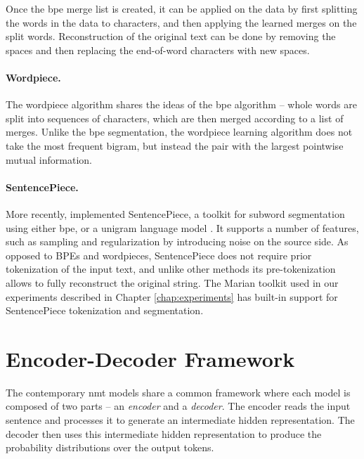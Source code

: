 Once the \ac{bpe} merge list is created, it can be applied on the data by first
splitting the words in the data to characters, and then applying the learned
merges on the split words. Reconstruction of the original text can be done by
removing the spaces and then replacing the end-of-word characters with new
spaces.

\paragraph{Wordpiece.} The wordpiece algorithm
\citep{schuster-nakajima-2012-japanese,wu2016google} shares the ideas of the
\ac{bpe} algorithm -- whole words are split into sequences of characters, which
are then merged according to a list of merges. Unlike the \ac{bpe}
segmentation, the wordpiece learning algorithm does not take the most frequent
bigram, but instead the pair with the largest pointwise mutual
information.

\paragraph{SentencePiece.} More recently,
\citet{kudo-richardson-2018-sentencepiece} implemented SentencePiece, a toolkit
for subword segmentation using either \ac{bpe}, or a unigram language model
\citep{kudo-2018-subword}. It supports a number of features, such as sampling
and regularization by introducing noise on the source side. As opposed to BPEs
and wordpieces, SentencePiece does not require prior tokenization of the input
text, and unlike other methods its pre-tokenization allows to fully reconstruct
the original string. The Marian toolkit
\citep{junczys-dowmunt-etal-2018-marian} used in our experiments described in
Chapter \ref{chap:experiments} has built-in support for SentencePiece
tokenization and segmentation.


\section{Encoder-Decoder Framework}
\label{sec:encdec}

The contemporary \ac{nmt} models share a common framework where each model is
composed of two parts -- an \emph{encoder} and a \emph{decoder}. The encoder
reads the input sentence and processes it to generate an intermediate hidden
representation.  The decoder then uses this intermediate hidden representation
to produce the probability distributions over the output tokens.

